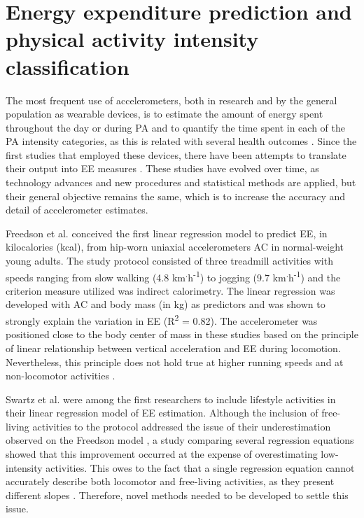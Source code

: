 \documentclass[12pt]{article}
\begin{document}
\section*{Energy expenditure prediction and physical activity intensity classification}

The most frequent use of accelerometers, both in research and by the general population as wearable devices, is to estimate the amount of energy spent throughout the day or during PA and to quantify the time spent in each of the PA intensity categories, as this is related with several health outcomes . Since the first studies that employed these devices, there have been attempts to translate their output into EE measures . These studies have evolved over time, as technology advances and new procedures and statistical methods are applied, but their general objective remains the same, which is to increase the accuracy and detail of accelerometer estimates.

Freedson et al.  conceived the first linear regression model to predict EE, in kilocalories (kcal), from hip-worn uniaxial accelerometers AC in normal-weight young adults. The study protocol consisted of three treadmill activities with speeds ranging from slow walking (4.8 km\textsuperscript{.}h\textsuperscript{-1}) to jogging (9.7 km\textsuperscript{.}h\textsuperscript{-1}) and the criterion measure utilized was indirect calorimetry. The linear regression was developed with AC and body mass (in kg) as predictors and was shown to strongly explain the variation in EE  (R\textsuperscript{2} = 0.82). The accelerometer was positioned close to the body center of mass in these studies based on the principle of linear relationship between vertical acceleration and EE during locomotion. Nevertheless, this principle does not hold true at higher running speeds and at non-locomotor activities .

Swartz et al.  were among the first researchers to include lifestyle activities in their linear regression model of EE estimation. Although the inclusion of free-living activities to the protocol addressed the issue of their underestimation observed on the Freedson model , a study comparing several regression equations  showed that this improvement occurred at the expense of overestimating low-intensity activities. This owes to the fact that a single regression equation cannot accurately describe both locomotor and free-living activities, as they present different slopes . Therefore, novel methods needed to be developed to settle this issue.
\end{document}
